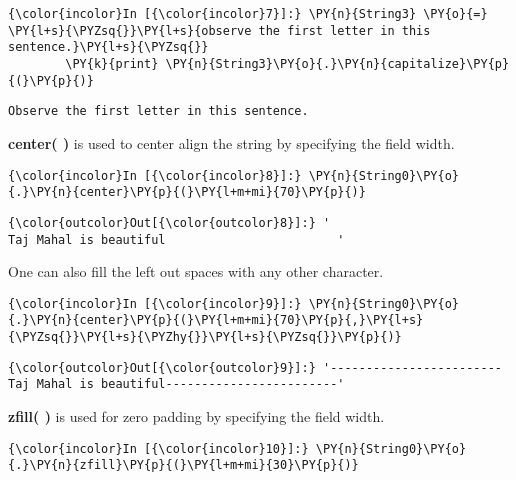    \begin{Verbatim}[commandchars=\\\{\}]
{\color{incolor}In [{\color{incolor}7}]:} \PY{n}{String3} \PY{o}{=} \PY{l+s}{\PYZsq{}}\PY{l+s}{observe the first letter in this sentence.}\PY{l+s}{\PYZsq{}}
        \PY{k}{print} \PY{n}{String3}\PY{o}{.}\PY{n}{capitalize}\PY{p}{(}\PY{p}{)}
\end{Verbatim}

    \begin{Verbatim}[commandchars=\\\{\}]
Observe the first letter in this sentence.
    \end{Verbatim}

    \textbf{center( )} is used to center align the string by specifying the
field width.

    \begin{Verbatim}[commandchars=\\\{\}]
{\color{incolor}In [{\color{incolor}8}]:} \PY{n}{String0}\PY{o}{.}\PY{n}{center}\PY{p}{(}\PY{l+m+mi}{70}\PY{p}{)}
\end{Verbatim}

            \begin{Verbatim}[commandchars=\\\{\}]
{\color{outcolor}Out[{\color{outcolor}8}]:} '                        Taj Mahal is beautiful                        '
\end{Verbatim}
        
    One can also fill the left out spaces with any other character.

    \begin{Verbatim}[commandchars=\\\{\}]
{\color{incolor}In [{\color{incolor}9}]:} \PY{n}{String0}\PY{o}{.}\PY{n}{center}\PY{p}{(}\PY{l+m+mi}{70}\PY{p}{,}\PY{l+s}{\PYZsq{}}\PY{l+s}{\PYZhy{}}\PY{l+s}{\PYZsq{}}\PY{p}{)}
\end{Verbatim}

            \begin{Verbatim}[commandchars=\\\{\}]
{\color{outcolor}Out[{\color{outcolor}9}]:} '------------------------Taj Mahal is beautiful------------------------'
\end{Verbatim}
        
    \textbf{zfill( )} is used for zero padding by specifying the field
width.

    \begin{Verbatim}[commandchars=\\\{\}]
{\color{incolor}In [{\color{incolor}10}]:} \PY{n}{String0}\PY{o}{.}\PY{n}{zfill}\PY{p}{(}\PY{l+m+mi}{30}\PY{p}{)}
\end{Verbatim}

